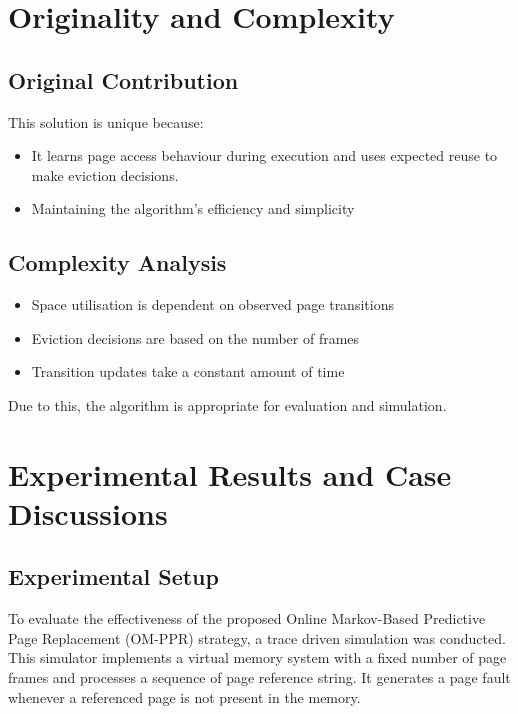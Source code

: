 \documentclass[conference]{IEEEtran}
\begin{document}
\section{Originality and Complexity}

\subsection{Original Contribution}

This solution is unique because:

\begin{itemize}
\item It learns page access behaviour during execution and uses expected reuse to make eviction decisions.
\item Maintaining the algorithm's efficiency and simplicity
\end{itemize}
\vspace{0.7\baselineskip}

\subsection{Complexity Analysis}

\begin{itemize}
\item Space utilisation is dependent on observed page transitions
\item Eviction decisions are based on the number of frames
\item Transition updates take a constant amount of time
\end{itemize}

Due to this, the algorithm is appropriate for evaluation and simulation.
\vspace{0.7\baselineskip}


\section{\textbf{Experimental Results and Case Discussions}}

\subsection{Experimental Setup}

To evaluate the effectiveness of the proposed Online Markov-Based Predictive Page Replacement (OM-PPR) strategy, a trace driven simulation was conducted. This simulator implements a virtual memory system with a fixed number of page frames and processes a sequence of page reference string. It generates a page fault whenever a referenced page is not present in the memory.
\end{document}
